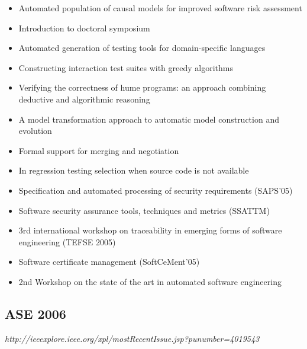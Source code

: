 {\begin{itemize}[itemsep=-1ex]
  \item Automated population of causal models for improved software risk assessment
  \item Introduction to doctoral symposium
  \item Automated generation of testing tools for domain-specific languages
  \item Constructing interaction test suites with greedy algorithms
  \item Verifying the correctness of hume programs: an approach combining deductive and algorithmic reasoning
  \item A model transformation approach to automatic model construction and evolution
  \item Formal support for merging and negotiation
  \item In regression testing selection when source code is not available
  \item Specification and automated processing of security requirements (SAPS'05)
  \item Software security assurance tools, techniques and metrics (SSATTM)
  \item 3rd international workshop on traceability in emerging forms of software engineering (TEFSE 2005)
  \item Software certificate management (SoftCeMent'05)
  \item 2nd Workshop on the state of the art in automated software engineering
\end{itemize}
}

\subsection{ASE 2006}

{\small \em http://ieeexplore.ieee.org/xpl/mostRecentIssue.jsp?punumber=4019543}

